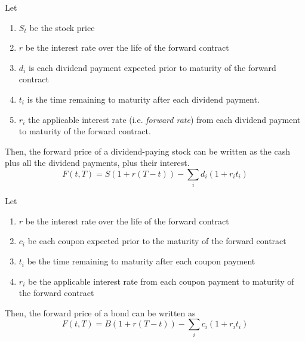 \documentclass{article}
\begin{document}
    \begin{example}
      Let 
      \begin{enumerate}
        \item $S_t$ be the stock price 
        \item $r$ be the interest rate over the life of the forward contract 
        \item $d_i$ is each dividend payment expected prior to maturity of the forward contract 
        \item $t_i$ is the time remaining to maturity after each dividend payment. 
        \item $r_i$ the applicable interest rate (i.e. \textit{forward rate}) from each dividend payment to maturity of the forward contract. 
      \end{enumerate}
      Then, the forward price of a dividend-paying stock can be written as the cash plus all the dividend payments, plus their interest. 
      \begin{equation}
        F(t, T) = S(1 + r (T - t)) - \sum_{i} d_i (1 + r_i t_i)
      \end{equation}
    \end{example}

    \begin{example}
      Let 
      \begin{enumerate}
        \item $r$ be the interest rate over the life of the forward contract 
        \item $c_i$ be each coupon expected prior to the maturity of the forward contract 
        \item $t_i$ be the time remaining to maturity after each coupon payment 
        \item $r_i$ be the applicable interest rate from each coupon payment to maturity of the forward contract
      \end{enumerate}
      Then, the forward price of a bond can be written as 
      \begin{equation}
        F(t, T) = B(1 + r(T - t)) - \sum_i c_i (1 + r_i t_i)
      \end{equation}
    \end{example}
\end{document}
